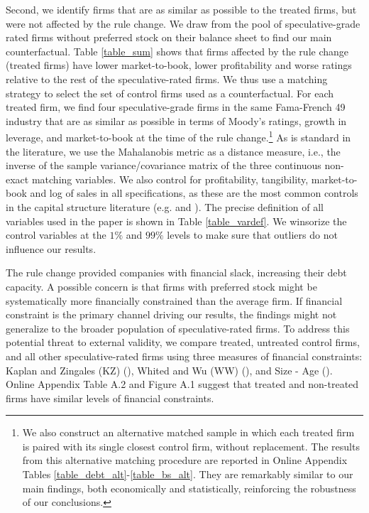 \documentclass[a4paper, 12pt]{article}
\begin{document}
Second, we identify firms that are as similar as possible to the treated firms, but were not affected by the rule change. We draw from the pool of speculative-grade rated firms without preferred stock on their balance sheet to find our main counterfactual. Table \ref{table_sum} shows that firms affected by the rule change (treated firms) have lower market-to-book, lower profitability and worse ratings relative to the rest of the speculative-rated firms. We thus use a matching strategy to select the set of control firms used as a counterfactual. For each treated firm, we find four speculative-grade firms in the same Fama-French 49 industry that are as similar as possible in terms of Moody's ratings, growth in leverage, and market-to-book at the time of the rule change.\footnote{We also construct an alternative matched sample in which each treated firm is paired with its single closest control firm, without replacement. The results from this alternative matching procedure are reported in Online Appendix Tables \ref{table_debt_alt}-\ref{table_bs_alt}. They are remarkably similar to our main findings, both economically and statistically, reinforcing the robustness of our conclusions.} As is standard in the literature, we use the Mahalanobis metric as a distance measure, i.e., the inverse of the sample variance/covariance matrix of the three continuous non-exact matching variables. We also control for profitability, tangibility, market-to-book and log of sales in all specifications, as these are the most common controls in the capital structure literature (e.g. \citealp{rajan1995we} and \citealp{deangelo2015stable}).  The precise definition of all variables used in the paper is shown in Table \ref{table_vardef}. We winsorize the control variables at the $1\%$ and $99\%$ levels to make sure that outliers do not influence our results.

The rule change provided companies with financial slack, increasing their debt capacity. A possible concern is that firms with preferred stock might be systematically more financially constrained than the average firm. If financial constraint is the primary channel driving our results, the findings might not generalize to the broader population of speculative-rated firms. To address this potential threat to external validity, we compare treated, untreated control firms, and all other speculative-rated firms using three measures of financial constraints: Kaplan and Zingales (KZ) (\cite{Lamontetal2001}), Whited and Wu (WW) (\cite{WhitedWu2006}), and Size - Age (\cite{HadlockPierce2010}). Online Appendix Table A.2 and Figure A.1 suggest that treated and non-treated firms have similar levels of financial constraints.
\end{document}
